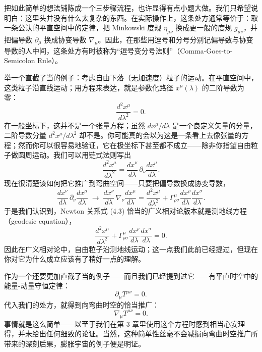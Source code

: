 把如此简单的想法铺陈成一个三步骤流程，也许显得有点小题大做。我们只希望说明白：这里头并没有什么太复杂的东西。在实际操作上，这条处方通常等价于：取一条公认的平直空间中的定律，把 Minkowski 度规 $\eta_{\mu\nu}$ 换成更一般的度规 $g_{\mu\nu}$，并把偏导数 $\partial_\mu$ 换成协变导数 $\nabla_\mu$。因此，在那些用逗号和分号分别记偏导数与协变导数的人中间，这条处方有时被称为“逗号变分号法则”（Comma-Goes-to-Semicolon Rule）。

举一个直截了当的例子：考虑自由下落（无加速度）粒子的运动。在平直空间中，这类粒子沿直线运动；用方程来表达，就是参数化路径 $x^\mu(\lambda)$ 的二阶导数为零：
\begin{equation*}
\frac{d^2x^\mu}{d\lambda^2} = 0.
\tag{4.3}
\end{equation*}
在一般坐标下，这并不是一个张量方程；虽然 $dx^\mu/d\lambda$ 是一个良定义矢量的分量，二阶导数分量 $d^2x^\mu/d\lambda^2$ 却不是。你可能真的会以为这是一条看上去像张量的方程；然而你可以很容易地验证，它在极坐标下甚至都不成立——除非你指望自由粒子做圆周运动。我们可以用链式法则写出
\begin{equation*}
\frac{d^2x^\mu}{d\lambda^2} = \frac{dx^\nu}{d\lambda}\,\partial_\nu\frac{dx^\mu}{d\lambda}.
\tag{4.4}
\end{equation*}
现在很清楚该如何把它推广到弯曲空间——只要把偏导数换成协变导数，
\begin{equation*}
\frac{dx^\nu}{d\lambda}\,\partial_\nu\frac{dx^\mu}{d\lambda}
\;\to\;
\frac{dx^\nu}{d\lambda}\,\nabla_\nu\frac{dx^\mu}{d\lambda}
= \frac{d^2x^\mu}{d\lambda^2} + \Gamma^\mu_{\rho\sigma}\frac{dx^\rho}{d\lambda}\frac{dx^\sigma}{d\lambda}.
\tag{4.5}
\end{equation*}
于是我们认识到，Newton 关系式 (4.3) 恰当的广义相对论版本就是测地线方程（geodesic equation），
\begin{equation*}
\frac{d^2x^\mu}{d\lambda^2} + \Gamma^\mu_{\rho\sigma}\frac{dx^\rho}{d\lambda}\frac{dx^\sigma}{d\lambda} = 0.
\tag{4.6}
\end{equation*}
因此在广义相对论中，自由粒子沿测地线运动；这一点我们此前已经提过，但现在你对它为什么成立应该有了稍好一点的理解。

作为一个还要更加直截了当的例子——而且我们已经提到过它——有平直时空中的能量-动量守恒定律：
\begin{equation*}
\partial_\mu T^{\mu\nu} = 0.
\tag{4.7}
\end{equation*}
代入我们的处方，就得到向弯曲时空的恰当推广：
\begin{equation*}
\nabla_\mu T^{\mu\nu} = 0.
\tag{4.8}
\end{equation*}
事情就是这么简单——以至于我们在第 3 章里使用这个方程时感到相当心安理得，并未给出任何细致的论证。当然，这种简单性丝毫不会减损向弯曲时空推广所带来的深刻后果，膨胀宇宙的例子便是明证。

